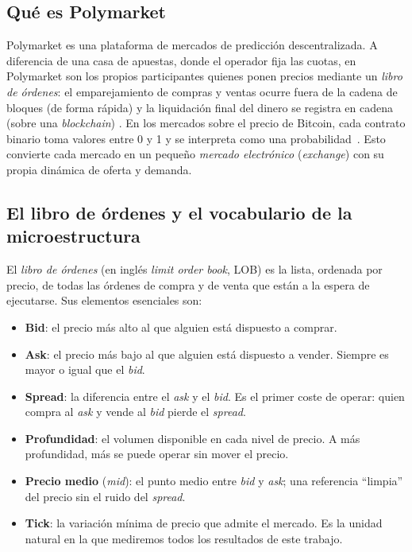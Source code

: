 \subsection{Qué es Polymarket}

Polymarket es una plataforma de mercados de predicción descentralizada. A diferencia de
una casa de apuestas, donde el operador fija las cuotas, en Polymarket son los propios
participantes quienes ponen precios mediante un \emph{libro de órdenes}: el emparejamiento
de compras y ventas ocurre fuera de la cadena de bloques (de forma rápida) y la
liquidación final del dinero se registra en cadena (sobre una \emph{blockchain})
\cite{polymarket_trading}. En los mercados sobre el precio de Bitcoin, cada contrato
binario toma valores entre 0 y 1 y se interpreta como una
probabilidad~\cite{polymarket_prices}. Esto convierte cada mercado en un pequeño
\emph{mercado electrónico} (\emph{exchange}) con su propia dinámica de oferta y demanda.

\subsection{El libro de órdenes y el vocabulario de la microestructura}

El \emph{libro de órdenes} (en inglés \emph{limit order book}, LOB) es la lista, ordenada
por precio, de todas las órdenes de compra y de venta que están a la espera de ejecutarse.
Sus elementos esenciales son:

\begin{itemize}
  \item \textbf{Bid}: el precio más alto al que alguien está dispuesto a comprar.
  \item \textbf{Ask}: el precio más bajo al que alguien está dispuesto a vender. Siempre
  es mayor o igual que el \emph{bid}.
  \item \textbf{Spread}: la diferencia entre el \emph{ask} y el \emph{bid}. Es el primer
  coste de operar: quien compra al \emph{ask} y vende al \emph{bid} pierde el \emph{spread}.
  \item \textbf{Profundidad}: el volumen disponible en cada nivel de precio. A más
  profundidad, más se puede operar sin mover el precio.
  \item \textbf{Precio medio} (\emph{mid}): el punto medio entre \emph{bid} y \emph{ask};
  una referencia ``limpia'' del precio sin el ruido del \emph{spread}.
  \item \textbf{Tick}: la variación mínima de precio que admite el mercado. Es la unidad
  natural en la que mediremos todos los resultados de este trabajo.
\end{itemize}

